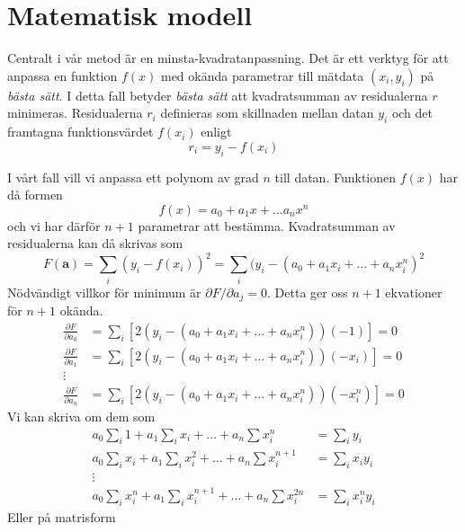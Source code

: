 \section{Matematisk modell}
\label{sec:modell}

Centralt i vår metod är en minsta-kvadratanpassning. Det är ett verktyg för att anpassa en funktion $f(x)$ med okända parametrar till mätdata $(x_i, y_i)$ på \emph{bästa sätt}. I detta fall betyder \emph{bästa sätt} att kvadratsumman av residualerna $r$ minimeras. Residualerna $r_i$ definieras som skillnaden mellan datan $y_i$ och det framtagna funktionsvärdet $f(x_i)$ enligt
\begin{equation}
r_i = y_i - f(x_i)
\end{equation} 

I vårt fall vill vi anpassa ett polynom av grad $n$ till datan. Funktionen $f(x)$ har då formen
\begin{equation}
f(x) = a_0 + a_1x + \dots a_n x^n
\end{equation}
och vi har därför $n + 1$ parametrar att bestämma. Kvadratsumman av residualerna kan då skrivas som
\begin{equation}
F(\mathbf{a}) = \sum_{i} (y_i - f(x_i))^2 = \sum_i (y_i - (a_0 + a_1x_i + \dots + a_n x_i^n)^2
\end{equation}
Nödvändigt villkor för minimum är $\partial F/\partial a_j = 0$. Detta ger oss $n + 1$ ekvationer för $n + 1$ okända.
\begin{align}
    \frac{\partial F}{\partial a_0} &= \sum_i \left[ 2(y_i - (a_0 + a_1x_i + \dots + a_n x_i^n))(-1) \right] = 0 \\
    \frac{\partial F}{\partial a_1} &= \sum_i \left[ 2(y_i - (a_0 + a_1x_i + \dots + a_n x_i^n))(-x_i) \right] = 0 \\
    \vdots \\
    \frac{\partial F}{\partial a_n} &= \sum_i \left[ 2(y_i - (a_0 + a_1x_i + \dots + a_n x_i^n))(-x_i^n) \right] = 0
\end{align}
Vi kan skriva om dem som
\begin{align}
a_0 \sum_i 1 + a_1 \sum_i x_i + \dots + a_n \sum x_i^n &= \sum_i y_i \\
a_0 \sum_i x_i + a_1 \sum_i x_i^2 + \dots + a_n \sum x_i^{n+1} &= \sum_i x_i y_i \\
\vdots \\
a_0 \sum_i x_i^n + a_1 \sum_i x_i^{n+1} + \dots + a_n \sum x_i^{2n} &= \sum_i x_i^n y_i
\end{align}
Eller på matrisform
